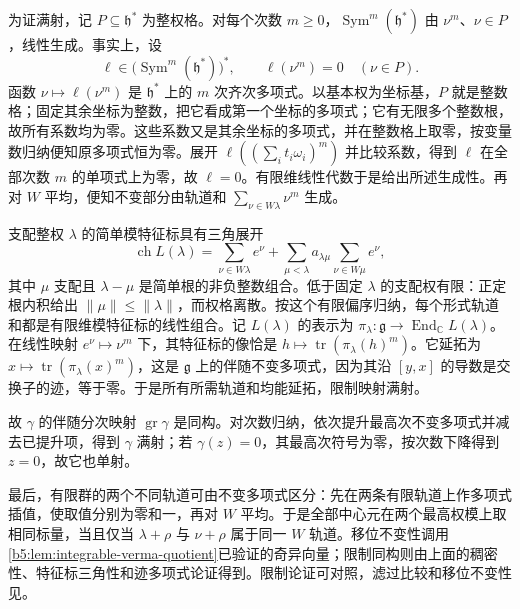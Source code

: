 \begin{proofsketch}
	为证满射，记 \(P\subseteq\mathfrak h^*\) 为整权格。对每个次数 \(m\ge0\)，\(\operatorname{Sym}^m(\mathfrak h^*)\) 由 \(\nu^m\)、\(\nu\in P\)，线性生成。事实上，设
	\[
		\ell\in\bigl(\operatorname{Sym}^m(\mathfrak h^*)\bigr)^*, \qquad \ell(\nu^m)=0\quad(\nu\in P).
	\]
	函数 \(\nu\mapsto\ell(\nu^m)\) 是 \(\mathfrak h^*\) 上的 \(m\) 次齐次多项式。以基本权为坐标基，\(P\) 就是整数格；固定其余坐标为整数，把它看成第一个坐标的多项式；它有无限多个整数根，故所有系数均为零。这些系数又是其余坐标的多项式，并在整数格上取零，按变量数归纳便知原多项式恒为零。展开 \(\ell((\sum_i t_i\omega_i)^m)\) 并比较系数，得到 \(\ell\) 在全部次数 \(m\) 的单项式上为零，故 \(\ell=0\)。有限维线性代数于是给出所述生成性。再对 \(W\) 平均，便知不变部分由轨道和 \(\sum_{\nu\in W\lambda}\nu^m\) 生成。

	支配整权 \(\lambda\) 的简单模特征标具有三角展开
	\[
		\operatorname{ch}L(\lambda) =\sum_{\nu\in W\lambda}e^\nu +\sum_{\mu<\lambda}a_{\lambda\mu} \sum_{\nu\in W\mu}e^\nu,
	\]
	其中 \(\mu\) 支配且 \(\lambda-\mu\) 是简单根的非负整数组合。低于固定 \(\lambda\) 的支配权有限：正定根内积给出 \(\|\mu\|\le\|\lambda\|\)，而权格离散。按这个有限偏序归纳，每个形式轨道和都是有限维模特征标的线性组合。记 \(L(\lambda)\) 的表示为 \(\pi_\lambda:\mathfrak g\to\operatorname{End}_{\mathbb C}L(\lambda)\)。在线性映射 \(e^\nu\mapsto\nu^m\) 下，其特征标的像恰是 \(h\mapsto\operatorname{tr}(\pi_\lambda(h)^m)\)。它延拓为 \(x\mapsto\operatorname{tr}(\pi_\lambda(x)^m)\)，这是 \(\mathfrak g\) 上的伴随不变多项式，因为其沿 \([y,x]\) 的导数是交换子的迹，等于零。于是所有所需轨道和均能延拓，限制映射满射。

	故 \(\gamma\) 的伴随分次映射 \(\operatorname{gr}\gamma\) 是同构。对次数归纳，依次提升最高次不变多项式并减去已提升项，得到 \(\gamma\) 满射；若 \(\gamma(z)=0\)，其最高次符号为零，按次数下降得到 \(z=0\)，故它也单射。

	最后，有限群的两个不同轨道可由不变多项式区分：先在两条有限轨道上作多项式插值，使取值分别为零和一，再对 \(W\) 平均。于是全部中心元在两个最高权模上取相同标量，当且仅当 \(\lambda+\rho\) 与 \(\nu+\rho\) 属于同一 \(W\) 轨道。移位不变性调用\cref{b5:lem:integrable-verma-quotient}已验证的奇异向量；限制同构则由上面的稠密性、特征标三角性和迹多项式论证得到。限制论证可对照\cite[Section 23.1]{Humphreys1972LieAlgebras}，滤过比较和移位不变性见\cite[Section 8.8, Theorems 8.50, 8.52 and 8.54]{Kirillov2008LieGroups}。
\end{proofsketch}

